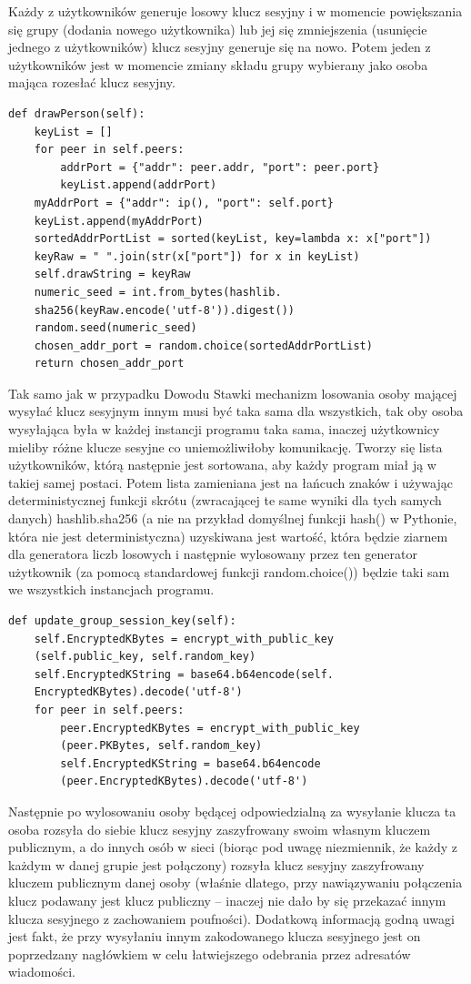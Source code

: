 Każdy z użytkowników generuje losowy klucz sesyjny i w momencie powiększania się grupy (dodania nowego użytkownika) lub jej się zmniejszenia (usunięcie jednego z użytkowników) klucz sesyjny generuje się na nowo. Potem jeden z użytkowników jest w momencie zmiany składu grupy wybierany jako osoba mająca rozesłać klucz sesyjny.

\begin{lstlisting}
def drawPerson(self):
    keyList = []
    for peer in self.peers:
        addrPort = {"addr": peer.addr, "port": peer.port}
        keyList.append(addrPort)
    myAddrPort = {"addr": ip(), "port": self.port}
    keyList.append(myAddrPort)
    sortedAddrPortList = sorted(keyList, key=lambda x: x["port"])
    keyRaw = " ".join(str(x["port"]) for x in keyList)
    self.drawString = keyRaw
    numeric_seed = int.from_bytes(hashlib.
    sha256(keyRaw.encode('utf-8')).digest())
    random.seed(numeric_seed)
    chosen_addr_port = random.choice(sortedAddrPortList)
    return chosen_addr_port
\end{lstlisting}

Tak samo jak w przypadku Dowodu Stawki mechanizm losowania osoby mającej wysyłać klucz sesyjnym innym musi być taka sama dla wszystkich, tak oby osoba wysyłająca była w każdej instancji programu taka sama, inaczej użytkownicy mieliby różne klucze sesyjne co uniemożliwiłoby komunikację. Tworzy się lista użytkowników, którą następnie jest sortowana, aby każdy program miał ją w takiej samej postaci. Potem lista zamieniana jest na łańcuch znaków i używając deterministycznej funkcji skrótu (zwracającej te same wyniki dla tych samych danych) hashlib.sha256 (a nie na przykład domyślnej funkcji hash() w Pythonie, która nie jest deterministyczna) uzyskiwana jest wartość, która będzie ziarnem dla generatora liczb losowych i następnie wylosowany przez ten generator użytkownik (za pomocą standardowej funkcji random.choice()) będzie taki sam we wszystkich instancjach programu.

\begin{lstlisting}
def update_group_session_key(self):
    self.EncryptedKBytes = encrypt_with_public_key
    (self.public_key, self.random_key)
    self.EncryptedKString = base64.b64encode(self.
    EncryptedKBytes).decode('utf-8')
    for peer in self.peers:
        peer.EncryptedKBytes = encrypt_with_public_key
        (peer.PKBytes, self.random_key)
        self.EncryptedKString = base64.b64encode
        (peer.EncryptedKBytes).decode('utf-8')
\end{lstlisting}
Następnie po wylosowaniu osoby będącej odpowiedzialną za wysyłanie klucza ta osoba rozsyła do siebie klucz sesyjny zaszyfrowany swoim własnym kluczem publicznym, a do innych osób w sieci (biorąc pod uwagę niezmiennik, że każdy z każdym w danej grupie jest połączony) rozsyła klucz sesyjny zaszyfrowany kluczem publicznym danej osoby (właśnie dlatego, przy nawiązywaniu połączenia klucz podawany jest klucz publiczny – inaczej nie dało by się przekazać innym klucza sesyjnego z zachowaniem poufności). Dodatkową informacją godną uwagi jest fakt, że przy wysyłaniu innym zakodowanego klucza sesyjnego jest on poprzedzany nagłówkiem w celu łatwiejszego odebrania przez adresatów wiadomości.

